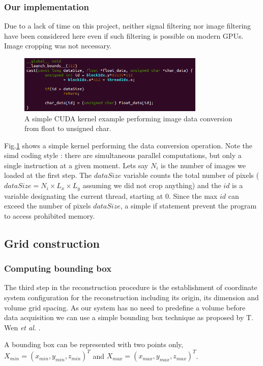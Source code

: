 \documentclass[12pt,journal,compsoc]{IEEEtran}
\begin{document}
\subsubsection{Our implementation}
Due to a lack of time on this project, neither signal filtering nor image filtering have been considered here even if such filtering is possible on modern GPUs. Image cropping was not necessary.

\begin{figure}[!h]
\centering
\includegraphics[width=3.5in]{simple_kernel}
\caption{A simple CUDA kernel example performing image data conversion from float to unsigned char.}
\label{kernel}
\end{figure}

Fig.\ref{kernel} shows a simple kernel performing the data conversion operation. Note the \ac{simd} coding style : there are simultaneous parallel computations, but only a single instruction at a given moment. Lets say $N_i$ is the number of images we loaded at the first step. 
The $dataSize$ variable counts the total number of pixels ($dataSize=N_i\times L_x\times L_y$ assuming we did not crop anything) and the $id$ is a variable designating the current thread, starting at 0. Since the max $id$ can exceed the number of pixels $dataSize$, a simple if statement prevent the program to access prohibited memory. 

\subsection{Grid construction}

\subsubsection{Computing bounding box}
The third step in the reconstruction procedure is the establishment of coordinate system configuration for the reconstruction including its origin, its dimension and volume grid spacing. As our system has no need to predefine a volume before data acquisition we can use a simple bounding box technique as proposed by T. Wen \textit{et al.} \cite{2}.

A bounding box can be represented with two points only, $X_{min} = (x_{min},y_{min},z_{min})^T$ and $X_{max} = (x_{max}, y_{max}, z_{max})^T$.
\end{document}
